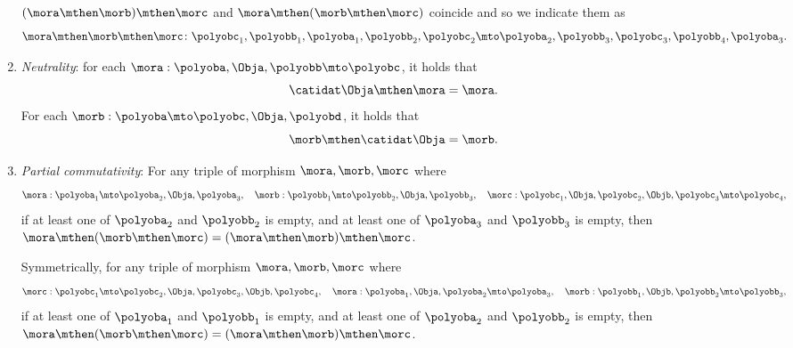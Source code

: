 \begin{ctdefinition}[Polycategory]
\begin{enumerate}
              $(\mora\mthen\morb)\mthen\morc$ and  $\mora\mthen(\morb\mthen\morc)$ coincide
              and so we indicate them as
              \begin{equation}
                  \mora\mthen\morb\mthen\morc \colon \polyobc_1 , \polyobb_1 ,  \polyoba_1 , \polyobb_2  ,\polyobc_2
                  \mto
                  \polyoba_2, \polyobb_3, \polyobc_3 ,\polyobb_4, \polyoba_3.
              \end{equation}
        \item \emph{Neutrality}: for each $\mora: \polyoba, \Obja, \polyobb \mto \polyobc$, it holds that
              \begin{equation}
                  \catidat\Obja  \mthen \mora  =\mora.
              \end{equation}
              For each $\morb: \polyoba \mto \polyobc, \Obja, \polyobd$, it holds that
              \begin{equation}
                  \morb \mthen \catidat\Obja =\morb.
              \end{equation}
        \item \emph{Partial commutativity}:
              For any triple of morphism $\mora,\morb,\morc$ where
              \begin{equation}
                  \mora: \polyoba_1 \mto  \polyoba_2, \Obja, \polyoba_3,
                  \quad \morb: \polyobb_1 \mto  \polyobb_2, \Obja , \polyobb_3,
                  \quad
                  \morc: \polyobc_1, \Obja, \polyobc_2, \Objb , \polyobc_3 \mto \polyobc_4,
              \end{equation}
              if at least one of $\polyoba_2$ and $\polyobb_2$ is empty,
              and at least one of $\polyoba_3$ and $\polyobb_3$ is empty, then $\mora\mthen(\morb\mthen\morc)=(\mora\mthen\morb)\mthen\morc$.

              Symmetrically, for any triple of morphism $\mora,\morb,\morc$ where
              \begin{equation}
                  \morc: \polyobc_1 \mto \polyobc_2, \Obja, \polyobc_3, \Objb , \polyobc_4,
                  \quad
                  \mora: \polyoba_1, \Obja, \polyoba_2 \mto \polyoba_3,
                  \quad
                  \morb: \polyobb_1, \Objb, \polyobb_2 \mto \polyobb_3,
              \end{equation}
              if at least one of $\polyoba_1$ and $\polyobb_1$ is empty,
              and at least one of $\polyoba_2$ and $\polyobb_2$ is empty, then $\mora\mthen(\morb\mthen\morc)=(\mora\mthen\morb)\mthen\morc$.
    \end{enumerate}
\end{ctdefinition}


